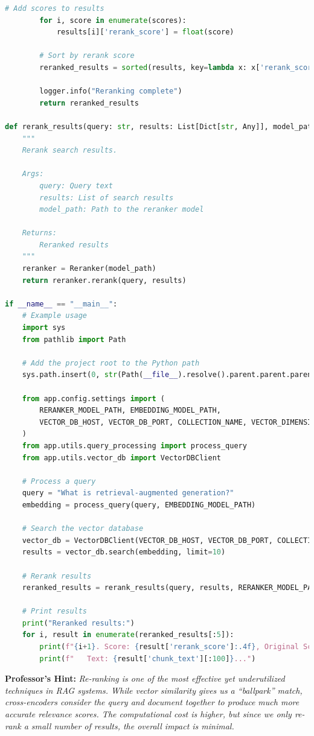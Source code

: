 \documentclass[
  screen,review,acmlarge]{acmart}
\begin{document}
\begin{lstlisting}[language=Python]
        # Add scores to results
        for i, score in enumerate(scores):
            results[i]['rerank_score'] = float(score)
        
        # Sort by rerank score
        reranked_results = sorted(results, key=lambda x: x['rerank_score'], reverse=True)
        
        logger.info("Reranking complete")
        return reranked_results

def rerank_results(query: str, results: List[Dict[str, Any]], model_path: str) -> List[Dict[str, Any]]:
    """
    Rerank search results.
    
    Args:
        query: Query text
        results: List of search results
        model_path: Path to the reranker model
        
    Returns:
        Reranked results
    """
    reranker = Reranker(model_path)
    return reranker.rerank(query, results)

if __name__ == "__main__":
    # Example usage
    import sys
    from pathlib import Path
    
    # Add the project root to the Python path
    sys.path.insert(0, str(Path(__file__).resolve().parent.parent.parent))
    
    from app.config.settings import (
        RERANKER_MODEL_PATH, EMBEDDING_MODEL_PATH,
        VECTOR_DB_HOST, VECTOR_DB_PORT, COLLECTION_NAME, VECTOR_DIMENSION
    )
    from app.utils.query_processing import process_query
    from app.utils.vector_db import VectorDBClient
    
    # Process a query
    query = "What is retrieval-augmented generation?"
    embedding = process_query(query, EMBEDDING_MODEL_PATH)
    
    # Search the vector database
    vector_db = VectorDBClient(VECTOR_DB_HOST, VECTOR_DB_PORT, COLLECTION_NAME, VECTOR_DIMENSION)
    results = vector_db.search(embedding, limit=10)
    
    # Rerank results
    reranked_results = rerank_results(query, results, RERANKER_MODEL_PATH)
    
    # Print results
    print("Reranked results:")
    for i, result in enumerate(reranked_results[:5]):
        print(f"{i+1}. Score: {result['rerank_score']:.4f}, Original Score: {result['score']:.4f}")
        print(f"   Text: {result['chunk_text'][:100]}...")
\end{lstlisting}

\textbf{Professor's Hint:} \emph{Re-ranking is one of the most effective yet underutilized techniques in RAG systems. While vector similarity gives us a ``ballpark'' match, cross-encoders consider the query and document together to produce much more accurate relevance scores. The computational cost is higher, but since we only re-rank a small number of results, the overall impact is minimal.}
\end{document}
